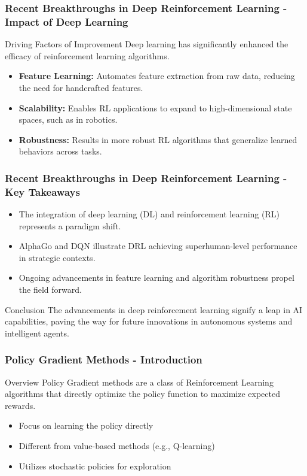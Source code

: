 \documentclass[aspectratio=169]{beamer}
\begin{document}
\begin{frame}[fragile]
    \frametitle{Recent Breakthroughs in Deep Reinforcement Learning - Impact of Deep Learning}
    \begin{block}{Driving Factors of Improvement}
        Deep learning has significantly enhanced the efficacy of reinforcement learning algorithms.
    \end{block}
    
    \begin{itemize}
        \item \textbf{Feature Learning:} Automates feature extraction from raw data, reducing the need for handcrafted features.
        \item \textbf{Scalability:} Enables RL applications to expand to high-dimensional state spaces, such as in robotics.
        \item \textbf{Robustness:} Results in more robust RL algorithms that generalize learned behaviors across tasks.
    \end{itemize}
\end{frame}

\begin{frame}[fragile]
    \frametitle{Recent Breakthroughs in Deep Reinforcement Learning - Key Takeaways}
    \begin{itemize}
        \item The integration of deep learning (DL) and reinforcement learning (RL) represents a paradigm shift.
        \item AlphaGo and DQN illustrate DRL achieving superhuman-level performance in strategic contexts.
        \item Ongoing advancements in feature learning and algorithm robustness propel the field forward.
    \end{itemize}
    
    \begin{block}{Conclusion}
        The advancements in deep reinforcement learning signify a leap in AI capabilities, paving the way for future innovations in autonomous systems and intelligent agents.
    \end{block}
\end{frame}

\begin{frame}[fragile]
    \frametitle{Policy Gradient Methods - Introduction}
    \begin{block}{Overview}
        Policy Gradient methods are a class of Reinforcement Learning algorithms that directly optimize the policy function to maximize expected rewards.
    \end{block}
    \begin{itemize}
        \item Focus on learning the policy directly
        \item Different from value-based methods (e.g., Q-learning)
        \item Utilizes stochastic policies for exploration
    \end{itemize}
\end{frame}
\end{document}
